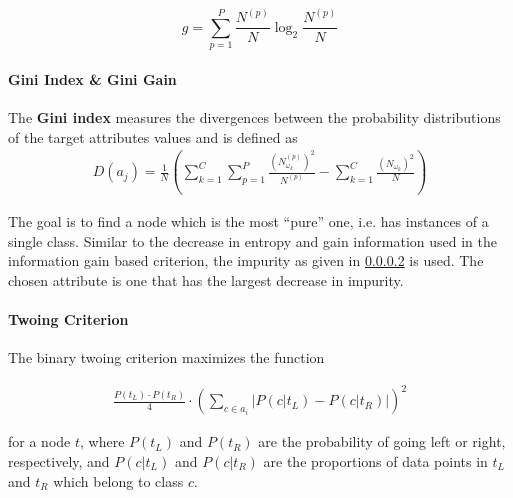 \begin{equation}
    g = \sum_{p=1}^P \frac{N^{(p)}}{N} \log_2 \frac{N^{(p)}}{N} \label{gainratio}
\end{equation}




\paragraph{Gini Index \& Gini Gain}

\begin{definition}
    The \textbf{Gini index} measures the divergences between the probability distributions of the target attributes values and is defined as
\begin{align}
    D(a_j) = \frac{1}{N}\left( \sum_{k=1}^{C}\sum_{p=1}^{P} \frac{\left( N_{\omega_k}^{(p)} \right)^2  }{N^{(p)}} - \sum_{k=1}^C \frac{\left( N_{\omega_k}\right)^2  }{N} \right)
\end{align}

\end{definition}

The goal is to find a node which is the most ``pure'' one, i.e. has instances of a single class. Similar to the decrease in entropy and gain information used in the information gain based criterion, the impurity as given in \ref{} is used. The chosen attribute is one that has the largest decrease in impurity.


\paragraph{Twoing Criterion}

\begin{definition}

The binary twoing criterion maximizes the function

\begin{align}
    \frac{P(t_L) \cdot P(t_R)}{4} \cdot \left( \sum_{c \in a_i} \left| P(c|t_L) - P(c|t_R) \right| \right) ^2
\end{align}

for a node $t$, where $P(t_L)$ and $P(t_R)$ are the probability of going left or right, respectively, and $P(c|t_L)$ and $P(c|t_R)$ are the proportions of data points in $t_L$ and $t_R$ which belong to class $c$.

\end{definition} 

